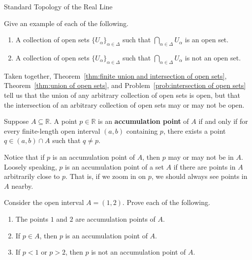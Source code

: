 \begin{section}{Standard Topology of the Real Line}
\begin{problem}\label{prob:intersection of open sets}
Give an example of each of the following.
\begin{enumerate}[label=\textrm{(\alph*)}]
\item A collection of open sets $\{U_{\alpha}\}_{\alpha\in\Delta}$ such that $\bigcap_{\alpha\in\Delta} U_{\alpha}$ is an open set.
\item A collection of open sets $\{U_{\alpha}\}_{\alpha\in\Delta}$ such that $\bigcap_{\alpha\in\Delta} U_{\alpha}$ is not an open set.
\end{enumerate}
\end{problem}

\begin{remark}\label{rem:union vs intersection of open sets}
Taken together, Theorem~\ref{thm:finite union and intersection of open sets}, Theorem~\ref{thm:union of open sets}, and Problem~\ref{prob:intersection of open sets} tell us that the union of any arbitrary collection of open sets is open, but that the intersection of an arbitrary collection of open sets may or may not be open.  
\end{remark}

\begin{definition}
Suppose $A\subseteq \mathbb{R}$. A point $p\in \mathbb{R}$ is an \textbf{accumulation point} of $A$ if and only if for every finite-length open interval $(a,b)$ containing $p$, there exists a point $q \in (a,b)\cap A$ such that $q\neq p$.
\end{definition}

Notice that if $p$ is an accumulation point of $A$, then $p$ may or may not be in $A$. Loosely speaking, $p$ is an accumulation point of a set $A$ if there are points in $A$ arbitrarily close to $p$. That is, if we zoom in on $p$, we should always see points in $A$ nearby.

\begin{problem}
Consider the open interval $A=(1,2)$. Prove each of the following.
\begin{enumerate}[label=\textrm{(\alph*)}]
\item The points $1$ and $2$ are accumulation points of $A$.
\item If $p\in A$, then $p$ is an accumulation point of $A$.
\item If $p<1$ or $p>2$, then $p$ is not an accumulation point of $A$.
\end{enumerate}
\end{problem}


\end{section}
